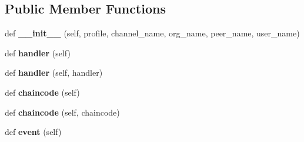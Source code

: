 \subsection*{Public Member Functions}
\begin{DoxyCompactItemize}
\item 
\mbox{\label{classavalon__sdk_1_1connector_1_1blockchains_1_1fabric_1_1event__listener_1_1EventListener_af88e59201db2af5be377ce501b079109}} 
def {\bfseries \+\_\+\+\_\+init\+\_\+\+\_\+} (self, profile, channel\+\_\+name, org\+\_\+name, peer\+\_\+name, user\+\_\+name)
\item 
\mbox{\label{classavalon__sdk_1_1connector_1_1blockchains_1_1fabric_1_1event__listener_1_1EventListener_ae233ec4e7540666617e9c799827c7b08}} 
def {\bfseries handler} (self)
\item 
\mbox{\label{classavalon__sdk_1_1connector_1_1blockchains_1_1fabric_1_1event__listener_1_1EventListener_ad92bb4d49ca432315053d27fca3e8cc5}} 
def {\bfseries handler} (self, handler)
\item 
\mbox{\label{classavalon__sdk_1_1connector_1_1blockchains_1_1fabric_1_1event__listener_1_1EventListener_ab8fc83bcfc5d684d9eea08f498c43bb0}} 
def {\bfseries chaincode} (self)
\item 
\mbox{\label{classavalon__sdk_1_1connector_1_1blockchains_1_1fabric_1_1event__listener_1_1EventListener_a91cb0034fdf5d6e9cc4339a42a78fecb}} 
def {\bfseries chaincode} (self, chaincode)
\item 
\mbox{\label{classavalon__sdk_1_1connector_1_1blockchains_1_1fabric_1_1event__listener_1_1EventListener_ab3a05b57c44b919b3882aba889146533}} 
def {\bfseries event} (self)
\item 
\mbox{\label{classavalon__sdk_1_1connector_1_1blockchains_1_1fabric_1_1event__listener_1_1EventListener_a67accf88f3e84d6efd9eca6bda3d096b}} 

\end{DoxyCompactItemize}
